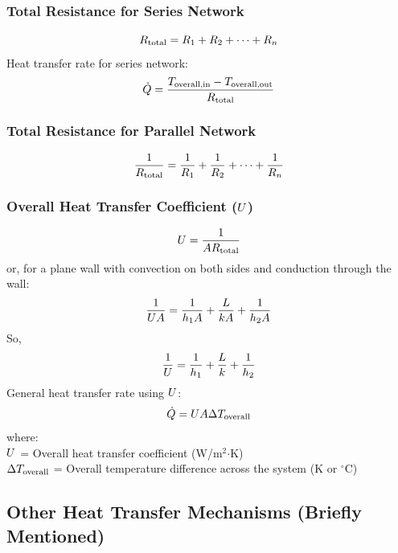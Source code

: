 \subsubsection*{Total Resistance for Series Network}
\begin{equation}
    R_{\text{total}} = R_1 + R_2 + \dots + R_n
\end{equation}
Heat transfer rate for series network:
\begin{equation}
    \dot{Q} = \frac{T_{\text{overall,in}} - T_{\text{overall,out}}}{R_{\text{total}}}
\end{equation}

\subsubsection*{Total Resistance for Parallel Network}
\begin{equation}
    \frac{1}{R_{\text{total}}} = \frac{1}{R_1} + \frac{1}{R_2} + \dots + \frac{1}{R_n}
\end{equation}

\subsubsection*{Overall Heat Transfer Coefficient ($U$)}
\begin{equation}
    U = \frac{1}{A R_{\text{total}}}
\end{equation}
or, for a plane wall with convection on both sides and conduction through the wall:
\begin{equation}
    \frac{1}{U A} = \frac{1}{h_1 A} + \frac{L}{k A} + \frac{1}{h_2 A}
\end{equation}
So,
\begin{equation}
    \frac{1}{U} = \frac{1}{h_1} + \frac{L}{k} + \frac{1}{h_2}
\end{equation}
General heat transfer rate using $U$:
\begin{equation}
    \dot{Q} = U A \Delta T_{\text{overall}}
\end{equation}
where: \\
$U$ = Overall heat transfer coefficient (W/m$^2$$\cdot$K) \\
$\Delta T_{\text{overall}}$ = Overall temperature difference across the system (K or $^\circ$C)

\subsection{Other Heat Transfer Mechanisms (Briefly Mentioned)}

